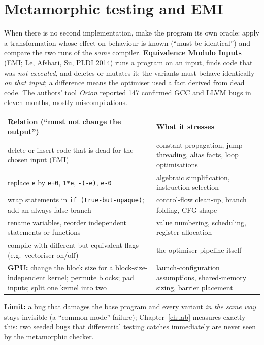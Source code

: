 \documentclass[10pt,a4paper,openany,oneside]{report}
\newcommand{\prio}[1]{\texorpdfstring{\ifcase#1\or{\color{gold}\ding{72}}\or{\color{gold}\ding{72}\ding{72}}\or{\color{gold}\ding{72}\ding{72}\ding{72}}\fi}{}}
\begin{document}
\section{Metamorphic testing and EMI \prio{2}}
When there is no second implementation, make the program its own oracle: apply a transformation whose effect on behaviour is known (``must be identical'') and compare the two runs of the \emph{same} compiler. \textbf{Equivalence Modulo Inputs} (EMI; Le, Afshari, Su, PLDI 2014) runs a program on an input, finds code that was \emph{not executed}, and deletes or mutates it: the variants must behave identically \emph{on that input}; a difference means the optimiser used a fact derived from dead code. The authors' tool \emph{Orion} reported 147 confirmed GCC and LLVM bugs in eleven months, mostly miscompilations.
\begin{center}\small
\begin{xltabular}{\textwidth}{@{}L{4.4cm}Y@{}}
\toprule
\textbf{Relation (``must not change the output'')} & \textbf{What it stresses}\\
\midrule\endhead
delete or insert code that is dead for the chosen input (EMI) & constant propagation, jump threading, alias facts, loop optimisations\\
replace \texttt{e} by \texttt{e+0}, \texttt{1*e}, \texttt{-(-e)}, \texttt{e-0} & algebraic simplification, instruction selection\\
wrap statements in \texttt{if (true-but-opaque)}; add an always-false branch & control-flow clean-up, branch folding, CFG shape\\
rename variables, reorder independent statements or functions & value numbering, scheduling, register allocation\\
compile with different but equivalent flags (e.g.\ vectoriser on/off) & the optimiser pipeline itself\\
\textbf{GPU:} change the block size for a block-size-independent kernel; permute blocks; pad inputs; split one kernel into two & launch-configuration assumptions, shared-memory sizing, barrier placement\\
\bottomrule
\end{xltabular}
\end{center}
\textbf{Limit:} a bug that damages the base program and every variant \emph{in the same way} stays invisible (a ``common-mode'' failure); Chapter~\ref{ch:lab} measures exactly this: two seeded bugs that differential testing catches immediately are never seen by the metamorphic checker.
\end{document}

